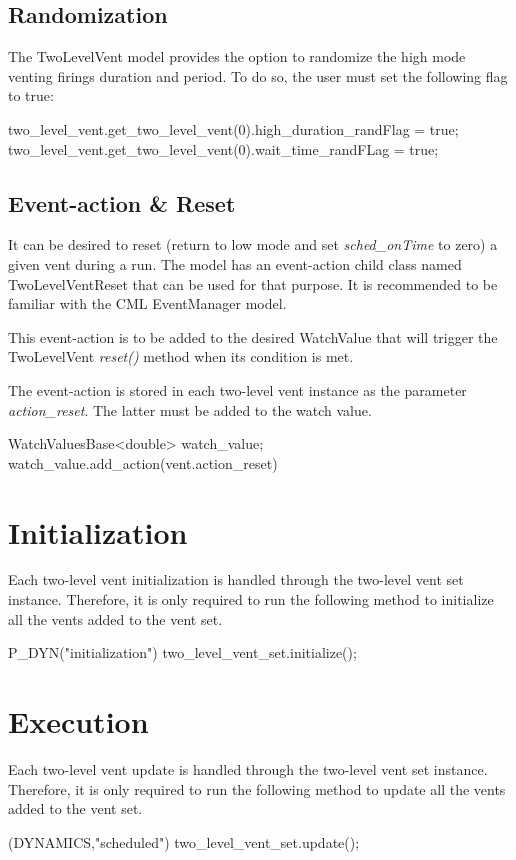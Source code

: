 \documentclass[11pt,fleqn]{report}
\begin{document}
\subsection{Randomization}
The TwoLevelVent model provides the option to randomize the high mode venting firings duration and period. To do so, the user must set 
the following flag to true:

\begin{codeC}
    two_level_vent.get_two_level_vent(0).high_duration_randFlag = true;
    two_level_vent.get_two_level_vent(0).wait_time_randFLag = true;
\end{codeC}

\subsection{Event-action \& Reset}
\noindent It can be desired to reset (return to low mode and set \emph{sched\_onTime} to zero) a given vent during a run. 
The model has an event-action child class named TwoLevelVentReset that can be used for that purpose.
It is recommended to be familiar with the CML EventManager model. 

\noindent This event-action is to be added to the desired WatchValue that will trigger the TwoLevelVent \emph{reset()} method 
when its condition is met.

\noindent The event-action is stored in each two-level vent instance as the parameter \emph{action\_reset}. 
The latter must be added to the watch value.

\begin{codeC}
    WatchValuesBase<double> watch_value;
    watch_value.add_action(vent.action_reset)
\end{codeC}

\section{Initialization}
\noindent Each two-level vent initialization is handled through the two-level vent set instance. Therefore, it is only required to
run the following method to initialize all the vents added to the vent set.

\begin{codeC}
P_DYN("initialization") two_level_vent_set.initialize();	
\end{codeC}

\section{Execution}
\noindent Each two-level vent update is handled through the two-level vent set instance. Therefore, it is only required to run the 
following method to update all the vents added to the vent set.
\begin{codeC}
(DYNAMICS,"scheduled") two_level_vent_set.update();	
\end{codeC}
\end{document}
